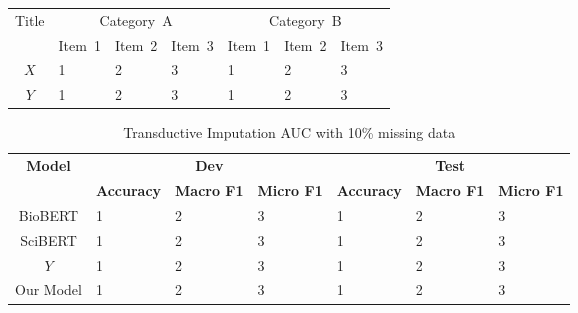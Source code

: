%	


\begin{tabular}{|c||l|l|l||l|l|l|}
	\hline
	\multirow{2}{*}{Title} 
	& \multicolumn{3}{c||}{Category~A} 
	& \multicolumn{3}{|c|}{Category~B} \\             \cline{2-7}
	& Item~1 & Item~2 & Item~3 & Item~1 & Item~2 & Item~3 \\  \hline
	$X$ & 1 & 2 & 3 & 1 & 2 & 3 \\      \hline
	$Y$ & 1 & 2 & 3 & 1 & 2 & 3 \\      \hline
\end{tabular}


\begin{table*}[t]
	\caption{Transductive Imputation AUC with 10\% missing data}
	\centering
	\label{10perc}
	\begin{small}
			\begin{tabular}{cllllll}
				\toprule
				\multirow{2}{*}{\textbf{Model}} 
				& \multicolumn{3}{c}{\textbf{Dev}} 
				& \multicolumn{3}{c}{\textbf{Test}} \\             
				& \textbf{Accuracy} & \textbf{Macro F1} & \textbf{Micro F1} & \textbf{Accuracy}&  \textbf{Macro F1} & \textbf{Micro F1} \\  
				\midrule
				BioBERT & 1 & 2 & 3 & 1 & 2 & 3 \\      
				SciBERT & 1 & 2 & 3 & 1 & 2 & 3 \\ 
				$Y$ & 1 & 2 & 3 & 1 & 2 & 3 \\ 
				Our Model & 1 & 2 & 3 & 1 & 2 & 3 \\ 
				\bottomrule    
			\end{tabular}
		
	\end{small}
\end{table*}